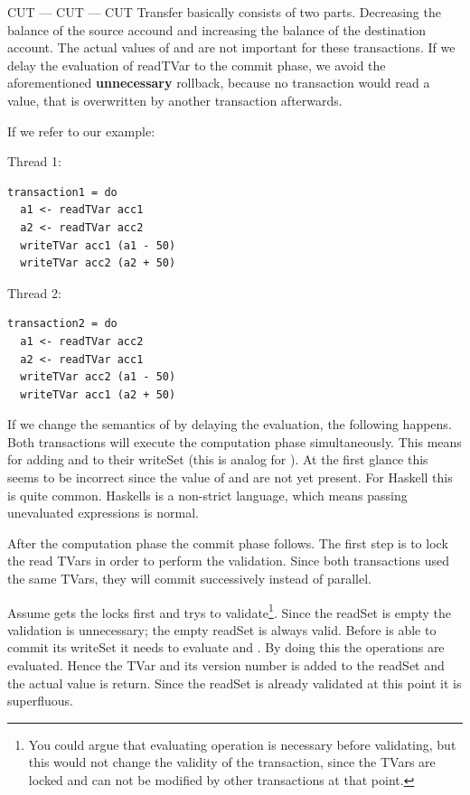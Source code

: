 
CUT --- CUT --- CUT
Transfer basically consists of two parts. Decreasing the balance of the source accound and increasing the 
balance of the destination account. The actual values of  and  are not important for
these transactions. If we delay the evaluation of readTVar to the commit phase, we avoid the 
aforementioned \textbf{unnecessary} rollback, because no transaction would read a value, that is overwritten
by another transaction afterwards. 

If we refer to our example: 
\par\noindent
\begin{minipage}[t]{.45\textwidth}
Thread 1:
\begin{lstlisting}[frame=lrtb]
transaction1 = do
  a1 <- readTVar acc1
  a2 <- readTVar acc2
  writeTVar acc1 (a1 - 50)
  writeTVar acc2 (a2 + 50)
\end{lstlisting}
\end{minipage}
\hfill
\begin{minipage}[t]{.45\textwidth}
Thread 2:
\begin{lstlisting}[frame=lrtb]
transaction2 = do 
  a1 <- readTVar acc2
  a2 <- readTVar acc1
  writeTVar acc2 (a1 - 50)
  writeTVar acc1 (a2 + 50)
\end{lstlisting}
\end{minipage}

If we change the semantics of  by delaying the evaluation, the following happens.
Both transactions will execute the computation phase simultaneously. This means for  adding
 and  to their writeSet (this is analog for ).
At the first glance this seems to be incorrect since the value of  and  are not yet present.
For Haskell this is quite common. Haskells is a non-strict language, which means passing unevaluated expressions
is normal. 

After the computation phase the commit phase follows. The first step is to lock the read TVars in order to 
perform the validation. Since both transactions used the same TVars, they will commit successively instead of
parallel. 

Assume  gets the locks first and trys to validate\footnote{You could argue that 
evaluating  operation is necessary before validating, but this would not change the validity of the 
transaction, since the TVars are locked and can not be modified by other transactions at that point.}. 
Since the readSet is empty the validation is unnecessary; the empty readSet is always valid. 
Before  is able to commit its writeSet it needs
to evaluate  and . By doing this the  operations are evaluated. Hence the 
TVar and its version number is added to the readSet and the actual value is return. Since the readSet is already 
validated at this point it is superfluous.

